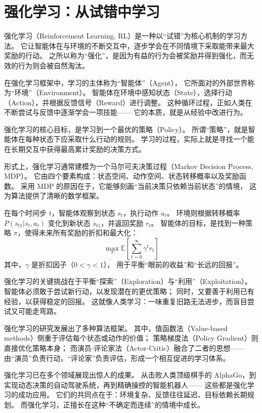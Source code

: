 \section{强化学习：从试错中学习}

强化学习（Reinforcement Learning, RL）是一种以“试错”为核心机制的学习方法。  
它让智能体在与环境的不断交互中，逐步学会在不同情境下采取能带来最大奖励的行动。  
之所以称为“强化”，是因为有益的行为会被奖励并得到强化，而无效的行为则会被自然淘汰。

在强化学习框架中，学习的主体称为“智能体”（Agent），  
它所面对的外部世界称为“环境”（Environment）。  
智能体在环境中感知状态（State），选择行动（Action），并根据反馈信号（Reward）进行调整。  
这种循环过程，正如人类在不断尝试与反馈中逐渐学会一项技能——  
它的本质，就是从经验中改进行为。

强化学习的核心目标，是学习到一个最优的策略（Policy）。  
所谓“策略”，就是智能体在每种状态下应采取什么行动的规则。  
学习的过程，实际上就是寻找一个能在长期交互中获得最高累计奖励的决策方式。

形式上，强化学习通常建模为一个马尔可夫决策过程（Markov Decision Process, MDP）。  
它由四个要素构成：状态空间、动作空间、状态转移概率以及奖励函数。  
采用 MDP 的原因在于，它能够刻画“当前决策只依赖当前状态”的情境，  
这为算法提供了清晰的数学框架。

在每个时间步 $t$，智能体观察到状态 $s_t$，执行动作 $a_t$。  
环境则根据转移概率 $P(s_{t1}|s_t, a_t)$ 变化到新状态 $s_{t1}$，并返回奖励 $r_t$。  
智能体的目标，是找到一种策略 $\pi$，使得未来所有奖励的折扣和最大化：
$$
\max_\pi \mathbb{E}\left[\sum_{t=0}^\infty \gamma^t r_t\right]
$$  
其中，$\gamma$ 是折扣因子（$0 < \gamma < 1$），  
用于平衡“眼前的收益”和“长远的回报”。

强化学习的关键挑战在于平衡“探索”（Exploration）与“利用”（Exploitation）。  
智能体必须敢于尝试新行动，以发现潜在的更优策略；  
同时，又要善于利用已有经验，以获得稳定的回报。  
这就像人类学习：一味重复旧路无法进步，而盲目尝试又可能走弯路。

强化学习的研究发展出了多种算法框架。  
其中，值函数法（Value-based methods）侧重于评估每个状态或动作的价值；  
策略梯度法（Policy Gradient）则直接优化策略本身；  
而演员-评论家法（Actor-Critic）融合了二者的思想——  
由“演员”负责行动，“评论家”负责评估，形成一个相互促进的学习体系。

强化学习已在多个领域展现出惊人的成果。  
从击败人类顶级棋手的 AlphaGo，到实现动态决策的自动驾驶系统，再到精确操控的智能机器人——  
这些都是强化学习的成功应用。  
它们的共同点在于：环境复杂、反馈往往延迟、目标依赖长期规划。  
而强化学习，正擅长在这种“不确定而连续”的情境中成长。

